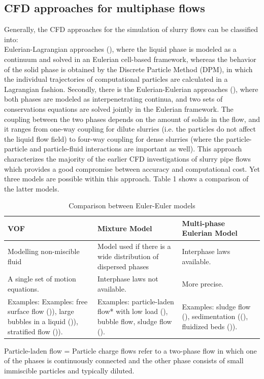 \documentclass[review,3p,times,12pt]{elsarticle}
\begin{document}
\subsection{CFD approaches for multiphase flows}
Generally, the CFD approaches for the simulation of slurry flows can be classified into:\\
Eulerian-Lagrangian approaches (\cite{crowe-2011}), where the liquid phase is modeled as a continuum and solved in an Eulerian cell-based framework, whereas the behavior of the solid  phase is obtained by the Discrete Particle Method (DPM), in which the individual trajectories of computational particles are calculated in a Lagrangian fashion. Secondly, there is the Eulerian-Eulerian approaches (\cite{crowe-2011}), where  both phases are modeled as interpenetrating continua, and two sets of conservations equations are solved jointly in the Eulerian framework. The coupling between the two phases depends on the amount of solids in the flow, and it ranges from one-way coupling for dilute slurries (i.e. the particles do not affect the liquid flow field) to four-way coupling for dense slurries (where the particle-particle and particle-fluid interactions are important as well). This approach characterizes the majority of the earlier CFD investigations of slurry pipe flows which provides a good compromise between accuracy and computational cost. Yet three models are possible within this approach. Table 1 shows a comparison of the latter models.
\begin{table}[H]
\caption{Comparison between Euler-Euler models}
\begin{tabular}{p{5.2cm}|p{5.2cm}|p{5.2cm}}
\hline VOF & Mixture Model & Multi-phase Eulerian Model \\
\hline Modelling non-miscible fluid & Model used if there is a wide distribution of dispersed phases & Interphase laws available. \\
\hline A single set of motion equations. & Interphase laws not available. & More precise. \\
\hline Examples: Examples: free surface flow (\cite{Jing-2016})), large bubbles in a liquid (\cite{Al-Yaari-2011})), stratified flow (\cite{Akhtar-2007})). & Examples: particle-laden flow* with low load (\cite{J-2007}), bubble flow, sludge flow (\cite{Liangyon-2009}).  & Examples: sludge flow (\cite{Ofei-2016}), sedimentation ((\cite{gopaliya-2016}), fluidized beds (\cite{Ofei-2014})).\\
\hline
\end{tabular}
\end{table}
{\footnotesize *Particle-laden flow = Particle charge flows refer to a two-phase flow in which one of the phases is continuously connected and the other phase consists of small immiscible particles and typically diluted.}
\end{document}
